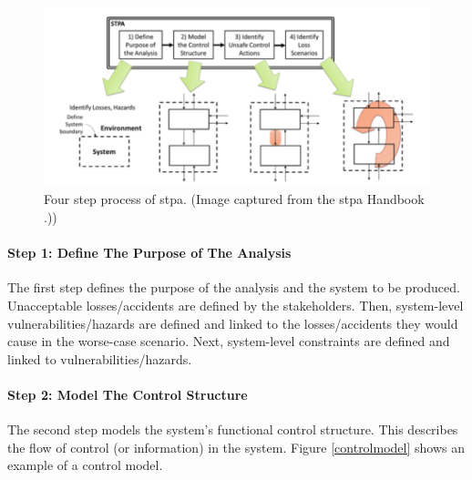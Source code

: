 \documentclass[../../main/main.tex]{subfiles}
\begin{document}
\begin{figure}[h]
\includegraphics[width=\linewidth]{../figures/4step}
\caption{\label{4step} Four step process of \gls{stpa}. (Image captured from the \gls{stpa} Handbook \cite{stpa}.))}
\end{figure}

\paragraph*{Step 1: Define The Purpose of The Analysis}
The first step defines the purpose of the analysis and the system to be produced.  Unacceptable losses/accidents are defined by the stakeholders.  Then, system-level vulnerabilities/hazards are defined and linked to the losses/accidents they would cause in the worse-case scenario.  Next, system-level constraints are defined and linked to vulnerabilities/hazards. 

\paragraph*{Step 2: Model The Control Structure}
The second step models the system's functional control structure.  This describes the flow of control (or information) in the system.  Figure \ref{controlmodel} shows an example of a control model.  
\end{document}
